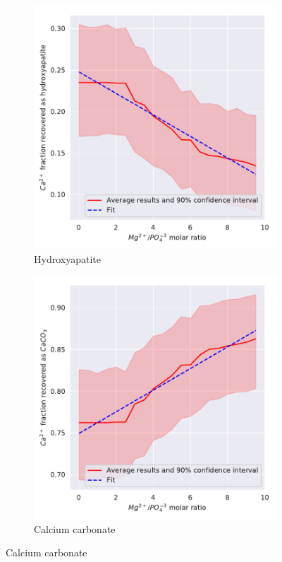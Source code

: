 \begin{refsection}[referencesCh3]
\begin{figure}[h]
\begin{subfigure}[t]{0.32\textheight}
		\includegraphics[width=\textwidth]{gfx/AppendixB/x_plotHAPYield_Mg} 
		\caption{Hydroxyapatite}
		\label{fig:Mg_influence_HAP}
	\end{subfigure} 
	\begin{subfigure}[t]{0.32\textheight}
		\includegraphics[width=\textwidth]{gfx/AppendixB/x_plotCaCO3Yield_Mg}
		\caption{Calcium carbonate}
		\label{fig:Mg_influence_CaCO3}
	\end{subfigure}
	

\end{figure}
\end{refsection}
